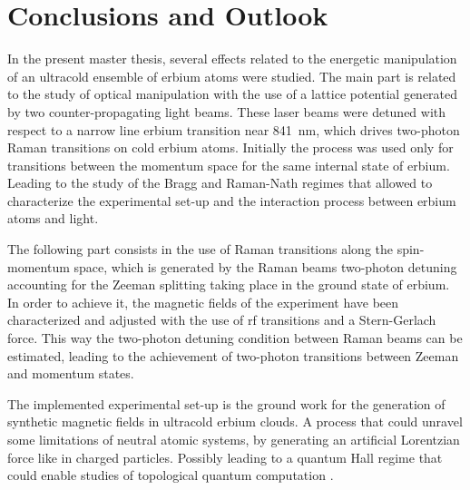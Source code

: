
\chapter{Conclusions and Outlook}
\label{chap:outlook}

In the present master thesis, several effects related to the energetic manipulation of an ultracold ensemble of erbium atoms were studied. The main part is related to the study of optical manipulation with the use of a lattice potential generated by two counter-propagating light beams. These laser beams were detuned with respect to a narrow line erbium transition near \SI{841}{\nano\meter}, which drives two-photon Raman transitions on cold erbium atoms. Initially the process was used only for transitions between the momentum space for the same internal state of erbium. Leading to the study of the Bragg and Raman-Nath regimes that allowed to characterize the experimental set-up and the interaction process between erbium atoms and light.

The following part consists in the use of Raman transitions along the spin-momentum space, which is generated by the Raman beams two-photon detuning accounting for the Zeeman splitting taking place in the ground state of erbium. In order to achieve it, the magnetic fields of the experiment have been characterized and adjusted with the use of \acl{rf} transitions and a Stern-Gerlach force. This way the two-photon detuning condition between Raman beams can be estimated, leading to the achievement of two-photon transitions between Zeeman and momentum states.

The implemented experimental set-up is the ground work for the generation of synthetic magnetic fields in ultracold erbium clouds. A process that could unravel some limitations of neutral atomic systems, by generating an artificial Lorentzian force like in charged particles. Possibly leading to a quantum Hall regime that could enable studies of topological quantum computation \cite{Lin2009}.




